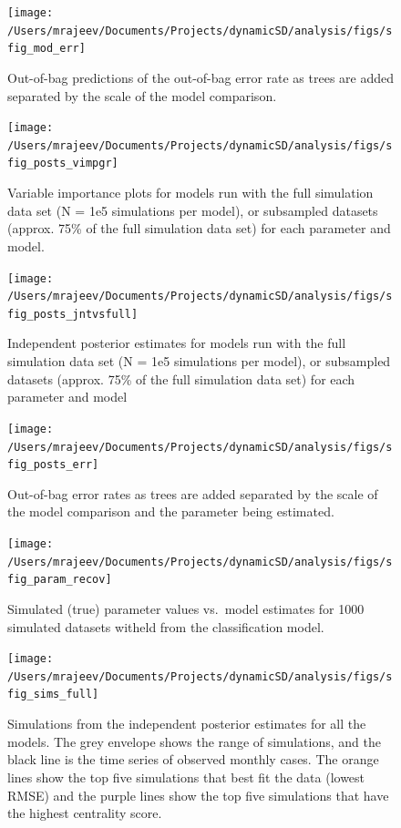 \documentclass[
  oneside]{book}
\begin{document}
\begin{figure}
\texttt{[image: /Users/mrajeev/Documents/Projects/dynamicSD/analysis/figs/sfig\_mod\_err]} \caption{Out-of-bag predictions of the out-of-bag error rate as trees are added separated by the scale of the model comparison.}\label{fig:sfig-mod-err}
\end{figure}



\begin{figure}
\texttt{[image: /Users/mrajeev/Documents/Projects/dynamicSD/analysis/figs/sfig\_posts\_vimpgr]} \caption[Variable importance plots for parameters with full or subsampled simulations.]{Variable importance plots for models run with the full simulation data set (N = 1e5 simulations per model), or subsampled datasets (approx. 75\% of the full simulation data set) for each parameter and model.}\label{fig:sfig-posts-vimp}
\end{figure}



\begin{figure}
\texttt{[image: /Users/mrajeev/Documents/Projects/dynamicSD/analysis/figs/sfig\_posts\_jntvsfull]} \caption[Independent posterior estimates for models run with the full simulation data set]{Independent posterior estimates for models run with the full simulation data set (N = 1e5 simulations per model), or subsampled datasets (approx. 75\% of the full simulation data set) for each parameter and model}\label{fig:sfig-posts-jntvsfull}
\end{figure}



\begin{figure}
\texttt{[image: /Users/mrajeev/Documents/Projects/dynamicSD/analysis/figs/sfig\_posts\_err]} \caption{Out-of-bag error rates as trees are added separated by the scale of the model comparison and the parameter being estimated.}\label{fig:sfig-posts-err}
\end{figure}



\begin{figure}
\texttt{[image: /Users/mrajeev/Documents/Projects/dynamicSD/analysis/figs/sfig\_param\_recov]} \caption{Simulated (true) parameter values vs.~model estimates for 1000 simulated datasets witheld from the classification model.}\label{fig:sfig-par-recov}
\end{figure}



\begin{figure}
\texttt{[image: /Users/mrajeev/Documents/Projects/dynamicSD/analysis/figs/sfig\_sims\_full]} \caption[Simulations from the independent posterior estimates for all the models.]{Simulations from the independent posterior estimates for all the models. The grey envelope shows the range of simulations, and the black line is the time series of observed monthly cases. The orange lines show the top five simulations that best fit the data (lowest RMSE) and the purple lines show the top five simulations that have the highest centrality score.}\label{fig:sfig-sims-full}
\end{figure}
\end{document}
